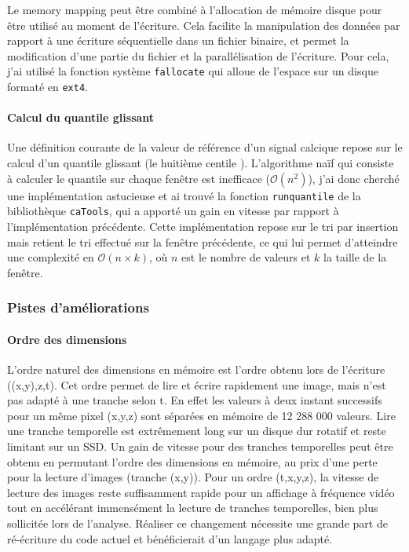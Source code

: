 Le memory mapping peut être combiné à l'allocation de mémoire disque pour être utilisé au moment de l'écriture. Cela facilite la manipulation des données par rapport à une écriture séquentielle dans un fichier binaire, et permet la modification d'une partie du fichier et la parallélisation de l'écriture. Pour cela, j'ai utilisé la fonction système \verb|fallocate| qui alloue de l'espace sur un disque formaté en \verb|ext4|.

\paragraph{Calcul du quantile glissant}
Une définition courante de la valeur de référence d'un signal calcique repose sur le calcul d'un quantile glissant (le huitième centile  \cite{dombeck_imaging_2007}). L'algorithme naïf qui consiste à calculer le quantile sur chaque fenêtre est inefficace ($\mathcal{O}(n^2)$), j'ai donc cherché une implémentation astucieuse et ai trouvé la fonction \verb|runquantile| de la bibliothèque \verb|caTools|, qui a apporté un gain en vitesse par rapport à l'implémentation précédente. Cette implémentation repose sur le tri par insertion mais retient le tri effectué sur la fenêtre précédente, ce qui lui permet d'atteindre une complexité en $\mathcal{O}(n\times k)$, où $n$ est le nombre de valeurs et $k$ la taille de la fenêtre.



\subsubsection{Pistes d'améliorations}

\paragraph{Ordre des dimensions}
L'ordre naturel des dimensions en mémoire est l'ordre obtenu lors de l'écriture ((x,y),z,t). Cet ordre permet de lire et écrire rapidement une image, mais n'est pas adapté à une tranche selon t. En effet les valeurs à deux instant successifs pour un même pixel (x,y,z) sont séparées en mémoire de 12 288 000 valeurs. Lire une tranche temporelle est extrêmement long sur un disque dur rotatif et reste limitant sur un SSD. Un gain de vitesse pour des tranches temporelles peut être obtenu en permutant l'ordre des dimensions en mémoire, au prix d'une perte pour la lecture d'images (tranche (x,y)). Pour un ordre (t,x,y,z), la vitesse de lecture des images reste suffisamment rapide pour un affichage à fréquence vidéo tout en accélérant immensément la lecture de tranches temporelles, bien plus sollicitée lors de l'analyse. Réaliser ce changement nécessite une grande part de ré-écriture du code actuel et bénéficierait d'un langage plus adapté.

